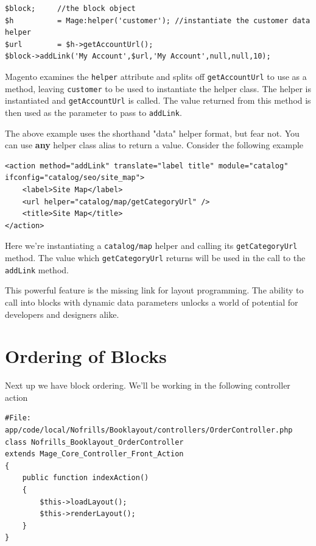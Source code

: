 \documentclass[oneside]{book}
\begin{document}
\begin{lstlisting}
$block;     //the block object
$h          = Mage:helper('customer'); //instantiate the customer data helper
$url        = $h->getAccountUrl();
$block->addLink('My Account',$url,'My Account',null,null,10);

\end{lstlisting}


Magento examines the \footnotesize\texttt{helper} \normalsize  attribute and splits off \footnotesize\texttt{getAccountUrl} \normalsize  to use as a method, leaving \footnotesize\texttt{customer} \normalsize  to be used to instantiate the helper class.  The helper is instantiated and \footnotesize\texttt{getAccountUrl} \normalsize  is called. The value returned from this method is then used as the parameter to pass to \footnotesize\texttt{addLink}\normalsize.   

The above example uses the shorthand "data" helper format, but fear not. You can use \textbf{any} helper class alias to return a value. Consider the following example

\begin{lstlisting}
<action method="addLink" translate="label title" module="catalog"
ifconfig="catalog/seo/site_map">
    <label>Site Map</label>
    <url helper="catalog/map/getCategoryUrl" />
    <title>Site Map</title>
</action>

\end{lstlisting}


Here we're instantiating a \footnotesize\texttt{catalog/map} \normalsize  helper and calling its \footnotesize\texttt{getCategoryUrl} \normalsize  method.  The value which \footnotesize\texttt{getCategoryUrl} \normalsize  returns will be used in the call to the \footnotesize\texttt{addLink} \normalsize  method.

This powerful feature is the missing link for layout programming.  The ability to call into blocks with dynamic data parameters unlocks a world of potential for developers and designers alike. 

\section{Ordering of Blocks}

Next up we have block ordering.  We'll be working in the following controller action

\begin{lstlisting}
#File: app/code/local/Nofrills/Booklayout/controllers/OrderController.php
class Nofrills_Booklayout_OrderController 
extends Mage_Core_Controller_Front_Action
{
    public function indexAction()
    {
        $this->loadLayout();
        $this->renderLayout();          
    }
}

\end{lstlisting}
\end{document}
